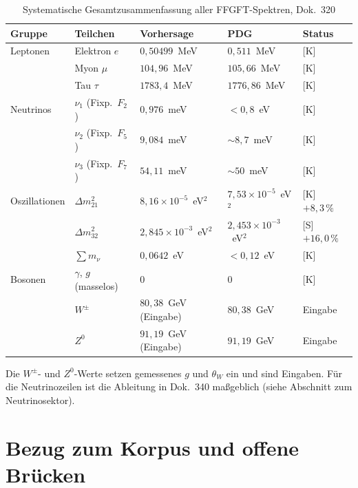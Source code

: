 \begin{table}[h!]
\centering
\caption{Systematische Gesamtzusammenfassung aller FFGFT-Spektren,
  Dok.~320}
\label{tab:gesamt}
\begin{tabular}{lllll}
\toprule
\textbf{Gruppe} & \textbf{Teilchen} & \textbf{Vorhersage} &
  \textbf{PDG} & \textbf{Status} \\
\midrule
Leptonen
  & Elektron $e$   & $0{,}50499$~MeV   & $0{,}511$~MeV   & [K] \\
  & Myon $\mu$     & $104{,}96$~MeV  & $105{,}66$~MeV  & [K] \\
  & Tau $\tau$     & $1783{,}4$~MeV  & $1776{,}86$~MeV & [K] \\
\midrule
Neutrinos
  & $\nu_1$ (Fixp.\ $F_2$) & $0{,}976$~meV  & $<0{,}8$~eV     & [K] \\
  & $\nu_2$ (Fixp.\ $F_5$) & $9{,}084$~meV  & $\sim8{,}7$~meV & [K] \\
  & $\nu_3$ (Fixp.\ $F_7$) & $54{,}11$~meV  & $\sim50$~meV    & [K] \\
\midrule
Oszillationen
  & $\Delta m_{21}^2$
    & $8{,}16\times10^{-5}$~eV$^2$ & $7{,}53\times10^{-5}$~eV$^2$
    & [K] $+8{,}3\,\%$ \\
  & $\Delta m_{32}^2$
    & $2{,}845\times10^{-3}$~eV$^2$ & $2{,}453\times10^{-3}$~eV$^2$
    & [S] $+16{,}0\,\%$ \\
  & $\sum m_\nu$
    & $0{,}0642$~eV & $<0{,}12$~eV & [K] \\
\midrule
Bosonen
  & $\gamma$, $g$ (masselos) & $0$ & $0$ & [K] \\
  & $W^\pm$ & $80{,}38$~GeV (Eingabe) & $80{,}38$~GeV & Eingabe \\
  & $Z^0$   & $91{,}19$~GeV (Eingabe) & $91{,}19$~GeV & Eingabe \\
\bottomrule
\end{tabular}
\end{table}
\noindent Die $W^\pm$- und $Z^0$-Werte setzen gemessenes $g$ und
$\theta_W$ ein und sind Eingaben. Für die Neutrinozeilen ist die
Ableitung in Dok.~340 maßgeblich (siehe Abschnitt zum Neutrinosektor).

\section{Bezug zum Korpus und offene Brücken}

